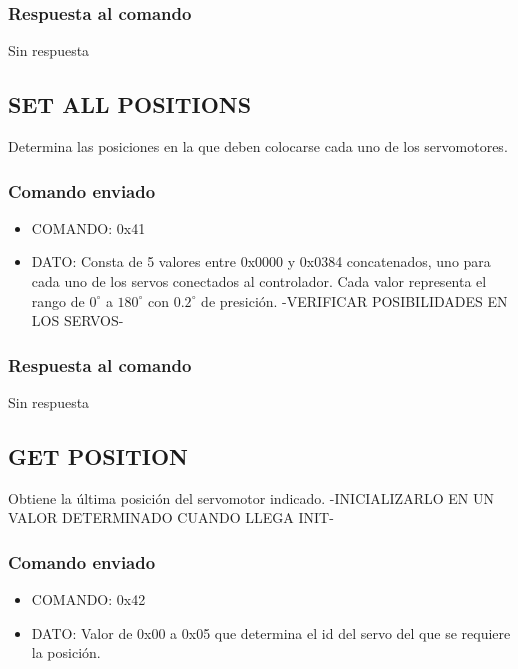 \documentclass[a4paper,10pt]{article}
\begin{document}
\subsubsection*{Respuesta al comando}

Sin respuesta

\subsection{SET ALL POSITIONS}
\label{set_all_positions}

Determina las posiciones en la que deben colocarse cada uno de los servomotores.

\subsubsection*{Comando enviado}

\begin{itemize}
	\item{COMANDO:} 0x41
	\item{DATO:} Consta de 5 valores entre 0x0000 y 0x0384 concatenados, uno para cada uno de los servos conectados al controlador.
	Cada valor representa el rango de $0^{\circ}$ a $180^{\circ}$ con $0.2^{\circ}$ de presici\'on. -VERIFICAR POSIBILIDADES EN LOS SERVOS-
\end{itemize}

\subsubsection*{Respuesta al comando}

Sin respuesta

\subsection{GET POSITION}
\label{get_position}

Obtiene la \'ultima posici\'on del servomotor indicado. -INICIALIZARLO EN UN VALOR DETERMINADO CUANDO LLEGA INIT-

\subsubsection*{Comando enviado}

\begin{itemize}
	\item{COMANDO:} 0x42
	\item{DATO:} Valor de 0x00 a 0x05 que determina el id del servo del que se requiere la posici\'on.
\end{itemize}
\end{document}
